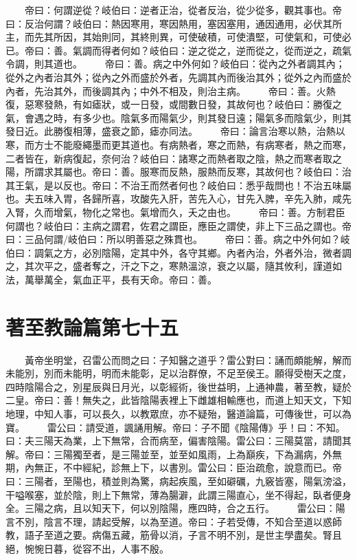 　　帝曰：何謂逆從？岐伯曰：逆者正治，從者反治，從少從多，觀其事也。帝曰：反治何謂？岐伯曰：熱因寒用，寒因熱用，塞因塞用，通因通用，必伏其所主，而先其所因，其始則同，其終則異，可使破積，可使潰堅，可使氣和，可使必已。帝曰：善。氣調而得者何如？岐伯曰：逆之從之，逆而從之，從而逆之，疏氣令調，則其道也。
　　帝曰：善。病之中外何如？岐伯曰：從內之外者調其內；從外之內者治其外；從內之外而盛於外者，先調其內而後治其外；從外之內而盛於內者，先治其外，而後調其內；中外不相及，則治主病。
　　帝曰：善。火熱復，惡寒發熱，有如瘧狀，或一日發，或間數日發，其故何也？岐伯曰：勝復之氣，會遇之時，有多少也。陰氣多而陽氣少，則其發日遠；陽氣多而陰氣少，則其發日近。此勝復相薄，盛衰之節，瘧亦同法。
　　帝曰：論言治寒以熱，治熱以寒，而方士不能廢繩墨而更其道也。有病熱者，寒之而熱，有病寒者，熱之而寒，二者皆在，新病復起，奈何治？岐伯曰：諸寒之而熱者取之陰，熱之而寒者取之陽，所謂求其屬也。帝曰：善。服寒而反熱，服熱而反寒，其故何也？岐伯曰：治其王氣，是以反也。帝曰：不治王而然者何也？岐伯曰：悉乎哉問也！不治五味屬也。夫五味入胃，各歸所喜，攻酸先入肝，苦先入心，甘先入脾，辛先入肺，咸先入腎，久而增氣，物化之常也。氣增而久，夭之由也。
　　帝曰：善。方制君臣何謂也？岐伯曰：主病之謂君，佐君之謂臣，應臣之謂使，非上下三品之謂也。帝曰：三品何謂/岐伯曰：所以明善惡之殊貫也。
　　帝曰：善。病之中外何如？岐伯曰：調氣之方，必別陰陽，定其中外，各守其鄉。內者內治，外者外治，微者調之，其次平之，盛者奪之，汗之下之，寒熱溫涼，衰之以屬，隨其攸利，謹道如法，萬舉萬全，氣血正平，長有天命。帝曰：善。

\section{著至教論篇第七十五}

　　黃帝坐明堂，召雷公而問之曰：子知醫之道乎？雷公對曰：誦而頗能解，解而未能別，別而未能明，明而未能彰，足以治群僚，不足至侯王。願得受樹天之度，四時陰陽合之，別星辰與日月光，以彰經術，後世益明，上通神農，著至教，疑於二皇。帝曰：善！無失之，此皆陰陽表裡上下雌雄相輸應也，而道上知天文，下知地理，中知人事，可以長久，以教眾庶，亦不疑殆，醫道論篇，可傳後世，可以為寶。
　　雷公曰：請受道，諷誦用解。帝曰：子不聞《陰陽傳》乎！曰：不知。曰：夫三陽天為業，上下無常，合而病至，偏害陰陽。雷公曰：三陽莫當，請聞其解。帝曰：三陽獨至者，是三陽並至，並至如風雨，上為巔疾，下為漏病，外無期，內無正，不中經紀，診無上下，以書別。雷公曰：臣治疏愈，說意而已。帝曰：三陽者，至陽也，積並則為驚，病起疾風，至如礔礪，九竅皆塞，陽氣滂溢，干嗌喉塞，並於陰，則上下無常，薄為腸澼，此謂三陽直心，坐不得起，臥者便身全。三陽之病，且以知天下，何以別陰陽，應四時，合之五行。
　　雷公曰：陽言不別，陰言不理，請起受解，以為至道。帝曰：子若受傳，不知合至道以惑師教，語子至道之要。病傷五藏，筋骨以消，子言不明不別，是世主學盡矣。腎且絕，惋惋日暮，從容不出，人事不殷。


